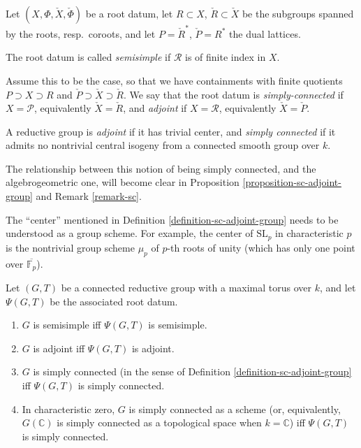 \begin{definition}
 \label{definition-sc-adjoint-rootdatum}
Let $(X,\Phi,\check X,\check\Phi)$ be a root datum, let $R\subset X$, $\check R\subset \check X$ be the subgroups spanned by the roots, resp.\ coroots, and let $P = \check R^*$, $\check P = R^*$ the dual lattices. 

The root datum is called {\it semisimple} if $\mathcal R$ is of finite index in $X$. 

Assume this to be the case, so that we have containments with finite quotients $P\supset X\supset R$ and $\check P\supset\check X\supset \check R$. We say that the root datum  is {\it simply-connected} if $X=\mathcal P$, equivalently $\check X=\check R$, and {\it adjoint} if $X=\mathcal R$, equivalently $\check X =\check P$. 
\end{definition}

\begin{definition}
 \label{definition-sc-adjoint-group}
A reductive group is {\it adjoint} if it has trivial center, and {\it simply connected} if it admits no nontrivial central isogeny from a connected smooth group over $k$.
\end{definition}

The relationship between this notion of being simply connected, and the algebrogeometric one, will become clear in Proposition  \ref{proposition-sc-adjoint-group} and Remark \ref{remark-sc}.

\begin{remark}
 \label{remark-central-groupscheme}
The ``center'' mentioned in Definition \ref{definition-sc-adjoint-group} needs to be understood as a group scheme. For example, the center of $\text{SL}_p$ in characteristic $p$ is the nontrivial group scheme $\mu_p$ of $p$-th roots of unity (which has only one point over $\overline{\mathbb F_p}$).
\end{remark}





\begin{proposition}
 \label{proposition-sc-adjoint-group}
Let $(G,T)$ be a connected reductive group with a maximal torus over $k$, and let $\Psi(G,T)$ be the associated root datum.
\begin{enumerate}
\item $G$ is semisimple iff $\Psi(G,T)$ is semisimple.
\item $G$ is adjoint iff $\Psi(G,T)$ is adjoint.
\item $G$ is simply connected (in the sense of Definition \ref{definition-sc-adjoint-group} iff $\Psi(G,T)$ is simply connected. 
\item In characteristic zero, $G$ is simply connected as a scheme (or, equivalently, $G(\mathbb C)$ is simply connected as a topological space when $k=\mathbb C$) iff $\Psi(G,T)$ is simply connected.
\end{enumerate}

\end{proposition}

